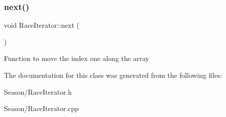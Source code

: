 \subsubsection{\texorpdfstring{next()}{next()}}
{\footnotesize\ttfamily void Race\+Iterator\+::next (\begin{DoxyParamCaption}{ }\end{DoxyParamCaption})}

Function to move the index one along the array 

The documentation for this class was generated from the following files\+:\begin{DoxyCompactItemize}
\item 
Season/Race\+Iterator.\+h\item 
Season/Race\+Iterator.\+cpp\end{DoxyCompactItemize}
